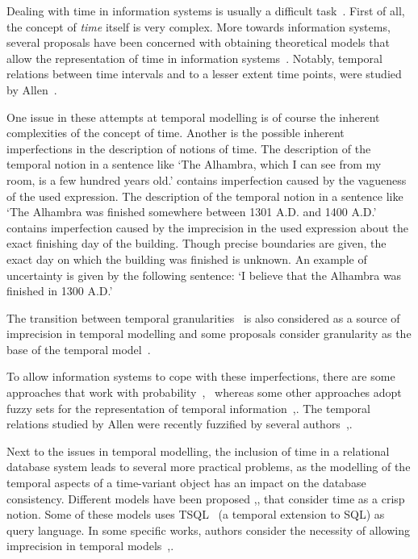 Dealing with time in information systems is usually a difficult task~\cite{Bolour1982}.
First of all, the concept of \emph{time} itself is very complex. More towards information systems, several proposals have been concerned with obtaining theoretical models that allow the representation of time in information systems~\cite{VanderCruyssen1997a}. Notably, temporal relations between time intervals and to a lesser extent time points, were studied by Allen~\cite{Allen1983}.

One issue in these attempts at temporal modelling is of course the inherent complexities of the concept of time. Another is the possible inherent imperfections in the description of notions of time. The description of the temporal notion in a sentence like `The Alhambra, which I can see from my room, is a few hundred years old.' contains imperfection caused by the vagueness of the used expression. The description of the temporal notion in a sentence like `The Alhambra was finished somewhere between 1301 A.D. and 1400 A.D.' contains imperfection caused by the imprecision in the used expression about the exact finishing day of the building. Though precise boundaries are given, the exact day on which the building was finished is unknown. An example of uncertainty is given by the following sentence: `I believe that the Alhambra was finished in 1300 A.D.'

The transition between temporal granularities~\cite{Lin1997a} is also considered as a source of imprecision in temporal modelling and some proposals consider granularity as the base of the temporal model~\cite{VanderCruyssen1997a}.

To allow information systems to cope with these imperfections, there are some approaches that work with probability~\cite{Dekhtyar2001},~\cite{Parisi2010} whereas some other approaches adopt fuzzy sets for the representation of temporal information~\cite{Billiet2011},\cite{Dubois2003}. The temporal relations studied by Allen were recently fuzzified by several authors~\cite{Ohlbach2004},\cite{Schockaert2008}.


Next to the issues in temporal modelling, the inclusion of time in a relational database system leads to several more practical problems, as the modelling of the temporal aspects of a time-variant object has an impact on the database consistency. Different models have been proposed \cite{Jensen1991},\cite{Snodgrass1984},\cite{Nascimento1995} that consider time as a crisp notion. Some of these models uses TSQL~\cite{Jensen1995} (a temporal extension to SQL) as query language. In some specific works, authors consider the necessity of allowing imprecision in temporal models~\cite{VanderCruyssen1997a},\cite{Garrido2009}.

